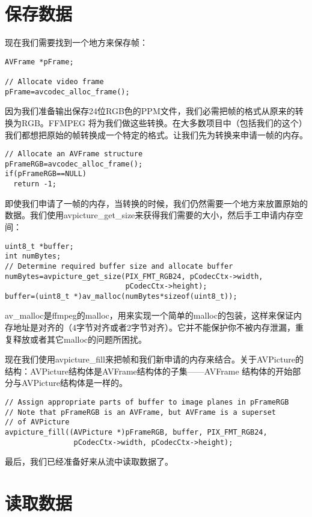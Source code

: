 \section{保存数据}

现在我们需要找到一个地方来保存帧：
\begin{lstlisting}
AVFrame *pFrame;

// Allocate video frame
pFrame=avcodec_alloc_frame();
\end{lstlisting}

因为我们准备输出保存24位RGB色的PPM文件，我们必需把帧的格式从原来的转换为RGB。FFMPEG 将为我们做这些转换。在大多数项目中（包括我们的这个）我们都想把原始的帧转换成一个特定的格式。让我们先为转换来申请一帧的内存。
\begin{lstlisting}
// Allocate an AVFrame structure
pFrameRGB=avcodec_alloc_frame();
if(pFrameRGB==NULL)
  return -1;
\end{lstlisting}

即使我们申请了一帧的内存，当转换的时候，我们仍然需要一个地方来放置原始的数据。我们使用avpicture_get_size来获得我们需要的大小，然后手工申请内存空间：

\begin{lstlisting}
uint8_t *buffer;
int numBytes;
// Determine required buffer size and allocate buffer
numBytes=avpicture_get_size(PIX_FMT_RGB24, pCodecCtx->width,
                            pCodecCtx->height);
buffer=(uint8_t *)av_malloc(numBytes*sizeof(uint8_t));
\end{lstlisting}

av_malloc是ffmpeg的malloc，用来实现一个简单的malloc的包装，这样来保证内存地址是对齐的（4字节对齐或者2字节对齐）。它并不能保护你不被内存泄漏，重复释放或者其它malloc的问题所困扰。

现在我们使用avpicture_fill来把帧和我们新申请的内存来结合。关于AVPicture的结构：AVPicture结构体是AVFrame结构体的子集——AVFrame 结构体的开始部分与AVPicture结构体是一样的。

\begin{lstlisting}
// Assign appropriate parts of buffer to image planes in pFrameRGB
// Note that pFrameRGB is an AVFrame, but AVFrame is a superset
// of AVPicture
avpicture_fill((AVPicture *)pFrameRGB, buffer, PIX_FMT_RGB24,
                pCodecCtx->width, pCodecCtx->height);
\end{lstlisting}

最后，我们已经准备好来从流中读取数据了。

\section{读取数据}


